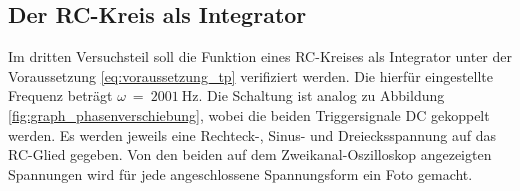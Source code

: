\subsection{Der RC-Kreis als Integrator}
Im dritten Versuchsteil soll die Funktion eines RC-Kreises als Integrator unter der Voraussetzung \eqref{eq:voraussetzung_tp} verifiziert werden.
Die hierfür eingestellte Frequenz beträgt $\omega~=~\qty{2001}{\hertz}$.
Die Schaltung ist analog zu Abbildung \ref{fig:graph_phasenverschiebung}, wobei die beiden Triggersignale DC gekoppelt werden.  
Es werden jeweils eine Rechteck-, Sinus- und Dreiecksspannung auf das RC-Glied gegeben.
Von den beiden auf dem Zweikanal-Oszilloskop angezeigten Spannungen wird für jede angeschlossene Spannungsform ein Foto gemacht.